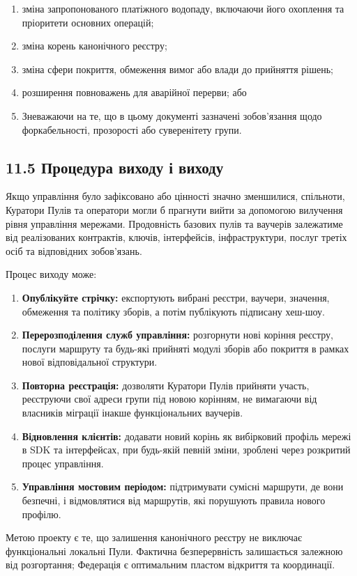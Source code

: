 \documentclass[11pt]{article}
\begin{document}
\begin{enumerate}[leftmargin=*]
\item зміна запропонованого платіжного водопаду, включаючи його охоплення та пріоритети основних операцій;
\item зміна корень канонічного реєстру;
\item зміна сфери покриття, обмеження вимог або влади до прийняття рішень;
\item розширення повноважень для аварійної перерви; або
\item Зневажаючи на те, що в цьому документі зазначені зобов'язання щодо форкабельності, прозорості або суверенітету групи.
\end{enumerate}
\subsection*{11.5 Процедура виходу і виходу}

Якщо управління було зафіксовано або цінності значно зменшилися, спільноти, Куратори Пулів та оператори могли б прагнути вийти за допомогою вилучення рівня управління мережами. Продовність базових пулів та ваучерів залежатиме від реалізованих контрактів, ключів, інтерфейсів, інфраструктури, послуг третіх осіб та відповідних зобов'язань.

Процес виходу може:

\begin{enumerate}[leftmargin=*]
\item \textbf{Опублікуйте стрічку:} експортують вибрані реєстри, ваучери, значення, обмеження та політику зборів, а потім публікують підписану хеш-шоу.
\item \textbf{Перерозподілення служб управління:} розгорнути нові коріння реєстру, послуги маршруту та будь-які прийняті модулі зборів або покриття в рамках нової відповідальної структури.
\item \textbf{Повторна реєстрація:} дозволяти Куратори Пулів прийняти участь, реєструючи свої адреси групи під новою корінням, не вимагаючи від власників міграції інакше функціональних ваучерів.
\item \textbf{Відновлення клієнтів:} додавати новий корінь як вибірковий профіль мережі в SDK та інтерфейсах, при будь-якій певній зміни, зроблені через розкритий процес управління.
\item \textbf{Управління мостовим періодом:} підтримувати сумісні маршрути, де вони безпечні, і відмовлятися від маршрутів, які порушують правила нового профілю.
\end{enumerate}
Метою проекту є те, що залишення канонічного реєстру не виключає функціональні локальні Пули. Фактична безперервність залишається залежною від розгортання; Федерація є оптимальним пластом відкриття та координації.
\end{document}
